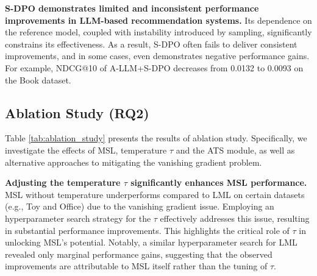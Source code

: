 \documentclass[sigconf,natbib=true]{acmart}
\newcommand{\cf}{\emph{cf. }}
\begin{document}
\textbf{S-DPO demonstrates limited and inconsistent performance improvements in LLM-based recommendation systems.} Its dependence on the reference model, coupled with instability introduced by sampling, significantly constrains its effectiveness. As a result, S-DPO often fails to deliver consistent improvements, and in some cases, even demonstrates negative performance gains. For example, NDCG@10 of A-LLM+S-DPO decreases from 0.0132 to 0.0093 on the Book dataset.


\subsection{Ablation Study (RQ2)}
\label{sec:ablation}
Table \ref{tab:ablation_study} presents the results of ablation study. Specifically, we investigate the effects of MSL, temperature $\tau$ and the ATS module, as well as alternative approaches to mitigating the vanishing gradient problem.

\textbf{Adjusting the temperature $\tau$ significantly enhances MSL performance.} MSL without temperature underperforms compared to LML on certain datasets (e.g., Toy and Office) due to the vanishing gradient issue. Employing an hyperparameter search strategy for the $\tau$ effectively addresses this issue, resulting in substantial performance improvements. This highlights the critical role of $\tau$ in unlocking MSL's potential. Notably, a similar hyperparameter search for LML revealed only marginal performance gains, suggesting that the observed improvements are attributable to MSL itself rather than the tuning of $\tau$. 
\end{document}
